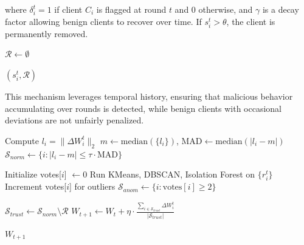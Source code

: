 where $\delta_i^t=1$ if client $C_i$ is flagged at round $t$ and $0$ otherwise, and $\gamma$ is a decay factor allowing benign clients to recover over time. 
If $s_i^t > \theta$, the client is permanently removed. 
\begin{algorithm}[H]
\caption{Temporal Suspicion Scoring}

$\mathcal{R} \gets \emptyset$\;

\Return $(s_i^t, \mathcal{R})$\;
\end{algorithm}

This mechanism leverages temporal history, ensuring that malicious behavior accumulating over rounds is detected, while benign clients with occasional deviations are not unfairly penalized.
\begin{algorithm}[H]
\caption{ServerProcedure($W_t, \{\Delta W_i^t, r_i^t\}, \{s_i\}$)}

Compute $l_i = \|\Delta W_i^t\|_2$\;
$m \gets \text{median}(\{l_i\})$, \quad $\text{MAD} \gets \text{median}(|l_i - m|)$\;
$\mathcal{S}_{norm} \gets \{ i : |l_i - m| \leq \tau \cdot \text{MAD} \}$\;

Initialize votes[$i$] $\gets 0$\;
Run KMeans, DBSCAN, Isolation Forest on $\{r_i^t\}$\;
Increment votes[$i$] for outliers\;
$\mathcal{S}_{anom} \gets \{ i : \text{votes}[i] \geq 2 \}$\;


$\mathcal{S}_{trust} \gets \mathcal{S}_{norm} \setminus \mathcal{R}$\;
$W_{t+1} \gets W_t + \eta \cdot \frac{\sum_{i \in \mathcal{S}_{trust}} \Delta W_i^t}{|\mathcal{S}_{trust}|}$\;

\Return $W_{t+1}$\;
\end{algorithm}
